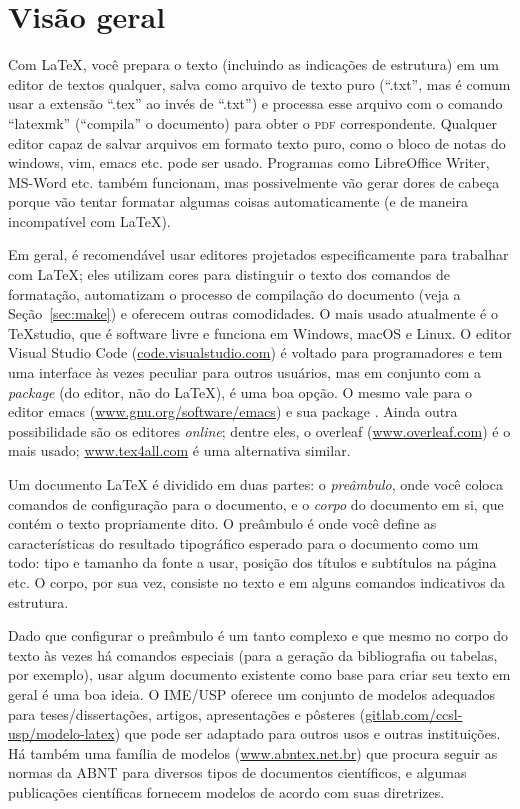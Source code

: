 \section{Visão geral}

\enlargethispage{.5\baselineskip}

Com \LaTeX{}, você prepara o texto (incluindo as indicações de estrutura) em
um editor de textos qualquer, salva como arquivo de texto puro (``.txt'',
mas é comum usar a extensão ``.tex'' ao invés de ``.txt'') e processa esse
arquivo com o comando ``latexmk'' (``compila'' o documento) para obter o
\textsc{pdf} correspondente. Qualquer editor capaz de salvar arquivos em formato
texto puro, como o bloco de notas do windows, vim, emacs etc. pode ser usado.
Programas como LibreOffice Writer, MS-Word etc. também funcionam, mas
possivelmente vão gerar dores de cabeça porque vão tentar formatar algumas
coisas automaticamente (e de maneira incompatível com \LaTeX{}).

Em geral, é recomendável usar editores projetados especificamente para
trabalhar com \LaTeX{}; eles utilizam cores para distinguir o texto dos
comandos de formatação, automatizam o processo de compilação do documento
(veja a Seção~\ref{sec:make}) e oferecem outras comodidades. O mais usado
atualmente é o \TeX{}studio, que é software livre e funciona em Windows,
macOS e Linux. O editor Visual Studio Code (\url{code.visualstudio.com})
é voltado para programadores e tem uma interface às vezes peculiar para
outros usuários, mas em conjunto com a \emph{package} 
(do editor, não do \LaTeX), é uma boa opção. O mesmo vale para o editor
emacs (\url{www.gnu.org/software/emacs}) e sua package .
Ainda outra possibilidade são os editores \emph{online}; dentre eles, o
overleaf (\url{www.overleaf.com}) é o mais usado; \url{www.tex4all.com}
é uma alternativa similar.

Um documento \LaTeX{} é dividido em duas partes: o \emph{preâmbulo}, onde
você coloca comandos de configuração para o documento, e o \emph{corpo}
do documento em si, que contém o texto propriamente dito. O preâmbulo é
onde você define as características do resultado tipográfico esperado
para o documento como um todo: tipo e tamanho da fonte a usar, posição
dos títulos e subtítulos na página etc. O corpo, por sua vez, consiste no
texto e em alguns comandos indicativos da estrutura.

Dado que configurar o preâmbulo é um tanto complexo e que mesmo no corpo
do texto às vezes há comandos especiais (para a geração da bibliografia
ou tabelas, por exemplo), usar algum documento existente como base para
criar seu texto em geral é uma boa ideia. O IME/USP oferece um conjunto
de modelos adequados para teses/dissertações, artigos, apresentações e
pôsteres (\url{gitlab.com/ccsl-usp/modelo-latex}) que pode ser adaptado
para outros usos e outras instituições. Há também uma família de modelos
(\url{www.abntex.net.br}) que procura seguir as normas da ABNT para
diversos tipos de documentos científicos, e algumas publicações científicas
fornecem modelos de acordo com suas diretrizes.

